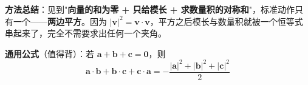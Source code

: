 \begin{answer}
\begin{gktip}
\textbf{方法总结}：见到"\textbf{向量的和为零 + 只给模长 + 求数量积的对称和}"，标准动作只有一个——\textbf{两边平方}。因为 $|\boldsymbol v|^{2}=\boldsymbol v\cdot\boldsymbol v$，平方之后模长与数量积就被一个恒等式串起来了，完全不需要求出任何一个夹角。

\textbf{通用公式}（值得背）：若 $\boldsymbol a+\boldsymbol b+\boldsymbol c=\boldsymbol 0$，则
\nopagebreak[4]
\[\boldsymbol a\cdot\boldsymbol b+\boldsymbol b\cdot\boldsymbol c+\boldsymbol c\cdot\boldsymbol a=-\frac{|\boldsymbol a|^{2}+|\boldsymbol b|^{2}+|\boldsymbol c|^{2}}2\]
\end{gktip}


\par\medskip

\end{answer}
